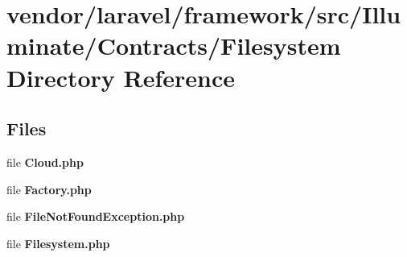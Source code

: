 \section{vendor/laravel/framework/src/\+Illuminate/\+Contracts/\+Filesystem Directory Reference}
\label{dir_b88469e7d465e54d3b633f7f089478ce}
\subsection*{Files}
\begin{DoxyCompactItemize}
\item 
file {\bf Cloud.\+php}
\item 
file {\bf Factory.\+php}
\item 
file {\bf File\+Not\+Found\+Exception.\+php}
\item 
file {\bf Filesystem.\+php}
\end{DoxyCompactItemize}
